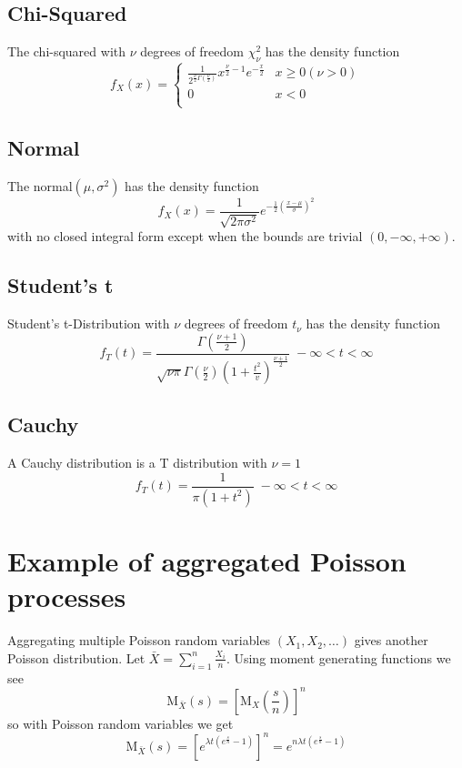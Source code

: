 \subsection{Chi-Squared}

The chi-squared with $\nu$ degrees of freedom $\chi^2_\nu$ has the density function
\[
f_X(x) =
\left\{ \begin{array}{ll}
\frac{1}{2^{\frac{\nu}{2}\Gamma(\frac{\nu}{2})}}x^{\frac{\nu}{2}-1}e^{-\frac{x}{2}} & x \geq 0 (\nu > 0) \\
0 & x < 0 \\
\end{array} \right.
\]

\subsection{Normal}

The normal$(\mu, \sigma^2)$ has the density function
\[
f_X(x) = \frac{1}{\sqrt{2 \pi \sigma^2}}e^{-\frac{1}{2}\left(\frac{x-\mu}{\sigma}\right)^2}
\]
with no closed integral form except when the bounds are trivial $(0, -\infty, +\infty)$.

\subsection{Student's t}

Student's t-Distribution with $\nu$ degrees of freedom $t_\nu$ has the density function
\[
f_T(t) = \frac{\Gamma\left(\frac{\nu + 1}{2}\right)}{\sqrt{\nu \pi}\Gamma\left(\frac{\nu}{2}\right)(1+\frac{t^2}{v})^\frac{\nu + 1}{2}} \; -\infty <t < \infty
\]

\subsection{Cauchy}

A Cauchy distribution is a T distribution with $\nu = 1$
\[
f_T(t) = \frac{1}{\pi(1+t^2)} \; -\infty < t < \infty
\]

\section{Example of aggregated Poisson processes}
\label{appendix:example1}

Aggregating multiple Poisson random variables $(X_1,X_2,\ldots)$ gives
another Poisson distribution.  Let $\bar X
=\sum_{i=1}^{n}{\frac{X_i}{n}}$.  Using moment generating functions we
see \[ \mbox{M}_{\bar X}(s) = \left[\mbox{M}_X(\frac{s}{n})\right]^n\]
so with Poisson random variables we get
\[
\mbox{M}_{\bar X}(s) = \left[e^{\lambda t(e^{\frac{s}{n}}-1)}\right]^n
= e^{n \lambda t(e^\frac{s}{n} - 1)}
\]

